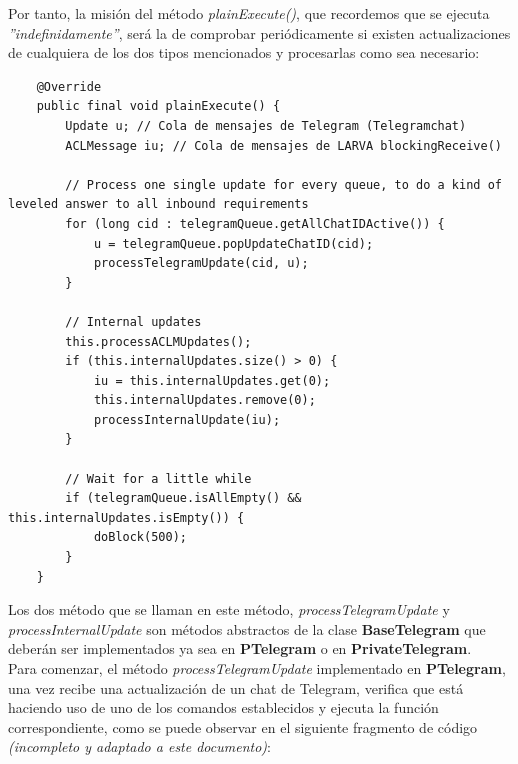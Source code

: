 Por tanto, la misión del método \textit{plainExecute()}, que recordemos que se ejecuta \textit{''indefinidamente''}, será la de comprobar periódicamente si existen actualizaciones de cualquiera de los dos tipos mencionados y procesarlas como sea necesario:\\

\begin{lstlisting}
    @Override
    public final void plainExecute() {
        Update u; // Cola de mensajes de Telegram (Telegramchat)
        ACLMessage iu; // Cola de mensajes de LARVA blockingReceive()
    
        // Process one single update for every queue, to do a kind of leveled answer to all inbound requirements
        for (long cid : telegramQueue.getAllChatIDActive()) {
            u = telegramQueue.popUpdateChatID(cid);
            processTelegramUpdate(cid, u);
        }
        
        // Internal updates
        this.processACLMUpdates();
        if (this.internalUpdates.size() > 0) {
            iu = this.internalUpdates.get(0);
            this.internalUpdates.remove(0);
            processInternalUpdate(iu);
        }
        
        // Wait for a little while
        if (telegramQueue.isAllEmpty() && this.internalUpdates.isEmpty()) {
            doBlock(500);
        }
    }
\end{lstlisting}

Los dos método que se llaman en este método, \textit{processTelegramUpdate} y \textit{processInternalUpdate} son métodos abstractos de la clase \textbf{BaseTelegram} que deberán ser implementados ya sea en \textbf{PTelegram} o en \textbf{PrivateTelegram}.\\

Para comenzar, el método \textit{processTelegramUpdate} implementado en \textbf{PTelegram}, una vez recibe una actualización de un chat de Telegram, verifica que está haciendo uso de uno de los comandos establecidos y ejecuta la función correspondiente, como se puede observar en el siguiente fragmento de código \textit{(incompleto y adaptado a este documento)}:\\

